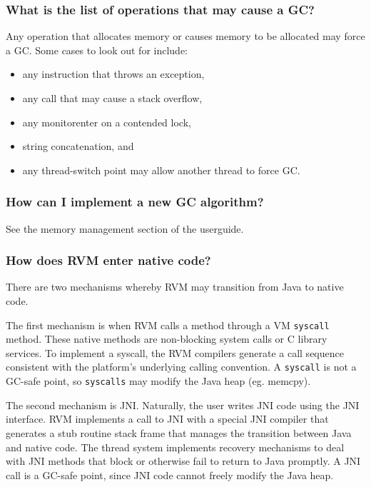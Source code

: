 \subsubsection{What is the list of operations that may cause a GC?}

Any operation that allocates memory or causes memory to be allocated may
force a GC.  Some cases to look out for include:
\begin{itemize}
\item any instruction that throws an exception,
\item any call that may cause a stack overflow,
\item any monitorenter on a contended lock,
\item string concatenation, and
\item any thread-switch point may allow another thread to force GC.
\end{itemize}

\subsubsection{How can I implement a new GC algorithm?}

See the memory management section of the userguide.

\subsubsection{How does RVM enter native code?}

There are two mechanisms whereby RVM may transition from Java to native
code.

The first mechanism is when RVM calls a method through a VM {\tt syscall}
method.  These native methods are non-blocking system calls or C library 
services.  To implement a syscall, the RVM compilers generate a call
sequence consistent with the platform's underlying calling convention.
A {\tt syscall} is not a GC-safe point, so {\tt syscalls} may modify the
Java heap (eg. memcpy).

The second mechanism is JNI.  Naturally, the user writes JNI code 
using the JNI interface.  RVM implements a call to JNI with a special JNI
compiler that generates a stub routine stack frame that manages the
transition between Java and native code.  The thread system implements 
recovery mechanisms to deal with JNI methods that block or otherwise fail
to return to Java promptly.  A JNI call is a GC-safe point, since JNI code
cannot freely modify the Java heap.

